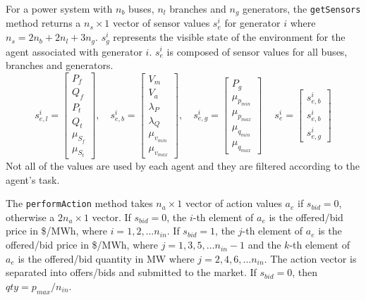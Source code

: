 

For a power system with $n_b$ buses, $n_l$ branches and $n_g$ generators, the
\texttt{getSensors} method returns a $n_s \times 1$ vector of sensor values
$s^i_e$ for generator $i$ where $n_s = 2n_b + 2n_l + 3n_g$.  $s^i_g$ represents
the visible state of the environment for the agent associated with generator
$i$.  $s^i_e$ is composed of sensor values for all buses, branches and
generators.
\begin{equation}
s^i_{e,l} =
\begin{bmatrix}
P_f\\
Q_f\\
P_t\\
Q_t\\
\mu_{S_f}\\
\mu_{S_t}
\end{bmatrix}, \quad
s^i_{e,b} =
\begin{bmatrix}
V_m\\
V_a\\
\lambda_P\\
\lambda_Q\\
\mu_{v_{min}}\\
\mu_{v_{max}}
\end{bmatrix}, \quad
s^i_{e,g} =
\begin{bmatrix}
P_g\\
\mu_{p_{min}}\\
\mu_{p_{max}}\\
\mu_{q_{min}}\\
\mu_{q_{max}}
\end{bmatrix}\ \quad
s^i_e =
\begin{bmatrix}
s^i_{e,b}\\
s^i_{e,b}\\
s^i_{e,g}
\end{bmatrix}
\end{equation}
Not all of the values are used by each agent and they are filtered according
to the agent's task.

The \texttt{performAction} method takes $n_a \times 1$ vector of action values
$a_e$ if $s_{bid} = 0$, otherwise a $2n_a \times 1$ vector.  If $s_{bid} = 0$,
the $i$-th element of $a_e$ is the offered/bid price in \$/MWh, where
$i = 1,2,\dotsc n_{in}$.  If $s_{bid} = 1$, the $j$-th element of $a_e$ is the
offered/bid price in \$/MWh, where $j = 1,3,5,\dotsc n_{in}-1$ and the $k$-th
element of $a_e$ is the offered/bid quantity in MW where $j = 2,4,6,\dotsc
n_{in}$.  The action vector is separated into offers/bids and submitted to the
market.  If $s_{bid} = 0$, then $qty = p_{max}/n_{in}$.

